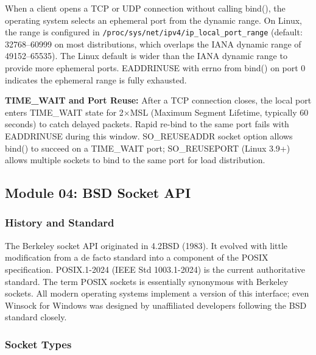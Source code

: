 \documentclass[11pt,letterpaper]{article}
\begin{document}
When a client opens a TCP or UDP connection without calling bind(), the operating system selects an ephemeral port from the dynamic range. On Linux, the range is configured in \texttt{/proc/sys/net/ipv4/ip\_local\_port\_range} (default: 32768--60999 on most distributions, which overlaps the IANA dynamic range of 49152--65535). The Linux default is wider than the IANA dynamic range to provide more ephemeral ports. EADDRINUSE with errno from bind() on port 0 indicates the ephemeral range is fully exhausted.

\textbf{TIME\_WAIT and Port Reuse:} After a TCP connection closes, the local port enters TIME\_WAIT state for 2$\times$MSL (Maximum Segment Lifetime, typically 60 seconds) to catch delayed packets. Rapid re-bind to the same port fails with EADDRINUSE during this window. SO\_REUSEADDR socket option allows bind() to succeed on a TIME\_WAIT port; SO\_REUSEPORT (Linux 3.9+) allows multiple sockets to bind to the same port for load distribution.

\subsection{Module 04: BSD Socket API}

\subsubsection{History and Standard}

The Berkeley socket API originated in 4.2BSD (1983). It evolved with little modification from a de facto standard into a component of the POSIX specification. POSIX.1-2024 (IEEE Std 1003.1-2024) is the current authoritative standard. The term POSIX sockets is essentially synonymous with Berkeley sockets. All modern operating systems implement a version of this interface; even Winsock for Windows was designed by unaffiliated developers following the BSD standard closely.

\subsubsection{Socket Types}
\end{document}
